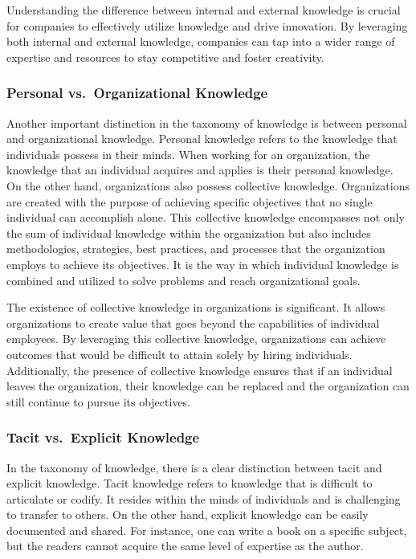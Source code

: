 Understanding the difference between internal and external knowledge is
crucial for companies to effectively utilize knowledge and drive
innovation. By leveraging both internal and external knowledge,
companies can tap into a wider range of expertise and resources to stay
competitive and foster creativity.

\subsubsection{Personal vs.~Organizational
  Knowledge}\label{personal-vs.-organizational-knowledge}

Another important distinction in the taxonomy of knowledge is between
personal and organizational knowledge. Personal knowledge refers to the
knowledge that individuals possess in their minds. When working for an
organization, the knowledge that an individual acquires and applies is
their personal knowledge. On the other hand, organizations also possess
collective knowledge. Organizations are created with the purpose of
achieving specific objectives that no single individual can accomplish
alone. This collective knowledge encompasses not only the sum of
individual knowledge within the organization but also includes
methodologies, strategies, best practices, and processes that the
organization employs to achieve its objectives. It is the way in which
individual knowledge is combined and utilized to solve problems and
reach organizational goals.

The existence of collective knowledge in organizations is significant.
It allows organizations to create value that goes beyond the
capabilities of individual employees. By leveraging this collective
knowledge, organizations can achieve outcomes that would be difficult to
attain solely by hiring individuals. Additionally, the presence of
collective knowledge ensures that if an individual leaves the
organization, their knowledge can be replaced and the organization can
still continue to pursue its objectives.

\subsubsection{Tacit vs.~Explicit
  Knowledge}\label{tacit-vs.-explicit-knowledge}

In the taxonomy of knowledge, there is a clear distinction between tacit
and explicit knowledge. Tacit knowledge refers to knowledge that is
difficult to articulate or codify. It resides within the minds of
individuals and is challenging to transfer to others. On the other hand,
explicit knowledge can be easily documented and shared. For instance,
one can write a book on a specific subject, but the readers cannot
acquire the same level of expertise as the author.

